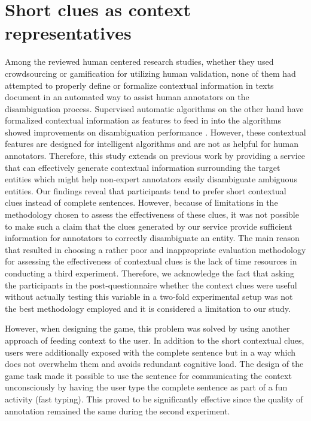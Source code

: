 \section{Short clues as context representatives}
Among the reviewed human centered research studies, whether they used crowdsourcing or gamification for utilizing human validation, none of them had attempted to properly define or formalize contextual information in texts document in an automated way to assist human annotators on the disambiguation process. Supervised automatic algorithms on the other hand have formalized contextual information as features to feed in into the algorithms showed improvements on disambiguation performance \cite{24,29,33}. However, these contextual features are designed for intelligent algorithms and are not as helpful for human annotators. Therefore, this study extends on previous work by providing a service that can effectively generate contextual information surrounding the target entities which might help non-expert annotators easily disambiguate ambiguous entities. Our findings reveal that participants tend to prefer short contextual clues instead of complete sentences. However, because of limitations in the methodology chosen to assess the effectiveness of these clues, it was not possible to make such a claim that the clues generated by our service provide sufficient information for annotators to correctly disambiguate an entity. The main reason that resulted in choosing a rather poor and inappropriate evaluation methodology for assessing the effectiveness of contextual clues is the lack of time resources in conducting a third experiment. Therefore, we acknowledge the fact that asking the participants in the post-questionnaire whether the context clues were useful without actually testing this variable in a two-fold experimental setup was not the best methodology employed and it is considered a limitation to our study. 

However, when designing the game, this problem was solved by using another approach of feeding context to the user. In addition to the short contextual clues, users were additionally exposed with the complete sentence but in a way which does not overwhelm them and avoids redundant cognitive load. The design of the game task made it possible to use the sentence for communicating the context unconsciously by having the user type the complete sentence as part of a fun activity (fast typing). This proved to be significantly effective since the quality of annotation remained the same during the second experiment.


